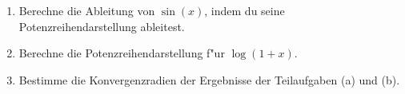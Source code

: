 \begin{prob}
\begin{enumerate}[label=(\alph*)]
\item Berechne die Ableitung von $\sin(x)$, indem du seine Potenzreihendarstellung ableitest.
\item Berechne die Potenzreihendarstellung f"ur $\log(1+x)$.
\item Bestimme die Konvergenzradien der Ergebnisse der Teilaufgaben (a) und (b).
\end{enumerate}
\end{prob}
